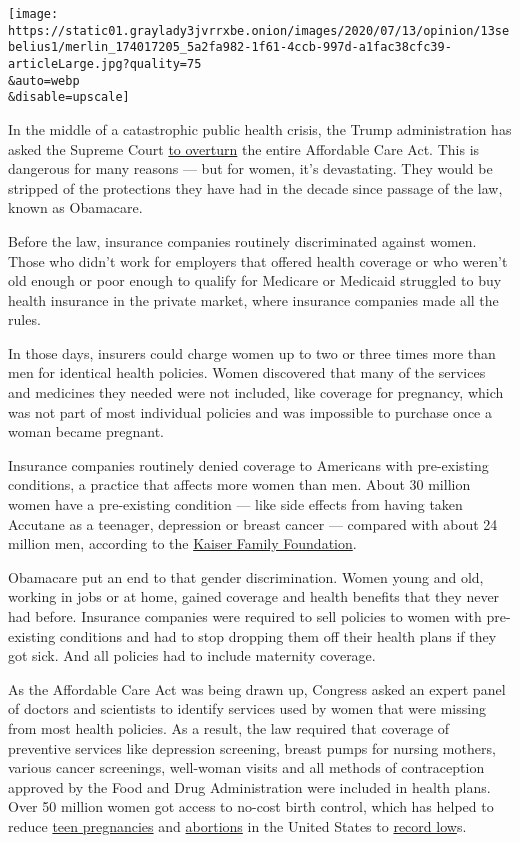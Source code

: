 \texttt{[image: https://static01.graylady3jvrrxbe.onion/images/2020/07/13/opinion/13sebelius1/merlin\_174017205\_5a2fa982-1f61-4ccb-997d-a1fac38cfc39-articleLarge.jpg?quality=75\\\&auto=webp\\\&disable=upscale]}

In the middle of a catastrophic public health crisis, the Trump
administration has asked the Supreme Court
\href{https://www.nytimes3xbfgragh.onion/2020/06/26/us/politics/obamacare-trump-administration-supreme-court.html}{to
overturn} the entire Affordable Care Act. This is dangerous for many
reasons --- but for women, it's devastating. They would be stripped of
the protections they have had in the decade since passage of the law,
known as Obamacare.

Before the law, insurance companies routinely discriminated against
women. Those who didn't work for employers that offered health coverage
or who weren't old enough or poor enough to qualify for Medicare or
Medicaid struggled to buy health insurance in the private market, where
insurance companies made all the rules.

In those days, insurers could charge women up to two or three times more
than men for identical health policies. Women discovered that many of
the services and medicines they needed were not included, like coverage
for pregnancy, which was not part of most individual policies and was
impossible to purchase once a woman became pregnant.

Insurance companies routinely denied coverage to Americans with
pre-existing conditions, a practice that affects more women than men.
About 30 million women have a pre-existing condition --- like side
effects from having taken Accutane as a teenager, depression or breast
cancer --- compared with about 24 million men, according to the
\href{https://www.kff.org/health-reform/issue-brief/pre-existing-condition-prevalence-for-individuals-and-families/}{Kaiser
Family Foundation}.

Obamacare put an end to that gender discrimination. Women young and old,
working in jobs or at home, gained coverage and health benefits that
they never had before. Insurance companies were required to sell
policies to women with pre-existing conditions and had to stop dropping
them off their health plans if they got sick. And all policies had to
include maternity coverage.

As the Affordable Care Act was being drawn up, Congress asked an expert
panel of doctors and scientists to identify services used by women that
were missing from most health policies. As a result, the law required
that coverage of preventive services like depression screening, breast
pumps for nursing mothers, various cancer screenings, well-woman visits
and all methods of contraception approved by the Food and Drug
Administration were included in health plans. Over 50 million women got
access to no-cost birth control, which has helped to reduce
\href{https://www.pewresearch.org/fact-tank/2019/08/02/why-is-the-teen-birth-rate-falling/}{teen
pregnancies} and
\href{https://www.guttmacher.org/fact-sheet/induced-abortion-united-states}{abortions}
in the United States to
\href{https://www.pewresearch.org/fact-tank/2019/08/02/why-is-the-teen-birth-rate-falling/}{record
low}s.


